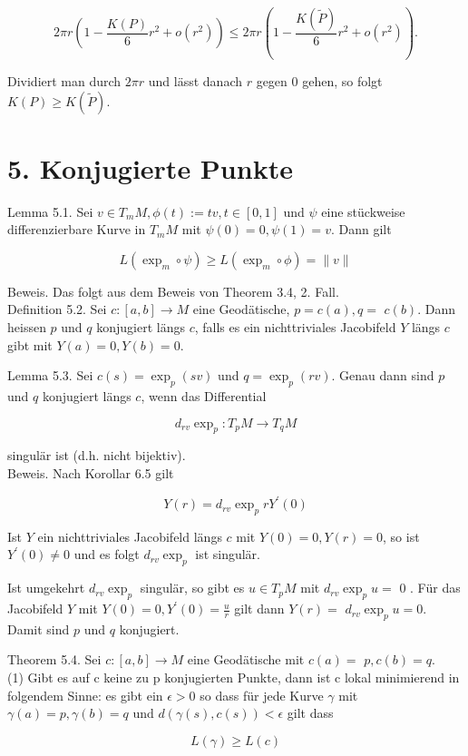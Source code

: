 \documentclass[10pt]{article}
\begin{document}
$$
2 \pi r\left(1-\frac{K(P)}{6} r^{2}+o\left(r^{2}\right)\right) \leq 2 \pi r\left(1-\frac{K(\tilde{P})}{6} r^{2}+o\left(r^{2}\right)\right) .
$$

Dividiert man durch $2 \pi r$ und lässt danach $r$ gegen 0 gehen, so folgt $K(P) \geq K(\tilde{P})$.

\section*{5. Konjugierte Punkte}
Lemma 5.1. Sei $v \in T_{m} M, \phi(t):=t v, t \in[0,1]$ und $\psi$ eine stückweise differenzierbare Kurve in $T_{m} M$ mit $\psi(0)=0, \psi(1)=v$. Dann gilt

$$
L\left(\exp _{m} \circ \psi\right) \geq L\left(\exp _{m} \circ \phi\right)=\|v\|
$$

Beweis. Das folgt aus dem Beweis von Theorem 3.4, 2. Fall.\\
Definition 5.2. Sei $c:[a, b] \rightarrow M$ eine Geodätische, $p=c(a), q=$ $c(b)$. Dann heissen $p$ und $q$ konjugiert längs $c$, falls es ein nichttriviales Jacobifeld $Y$ längs $c$ gibt mit $Y(a)=0, Y(b)=0$.

Lemma 5.3. Sei $c(s)=\exp _{p}(s v)$ und $q=\exp _{p}(r v)$. Genau dann sind $p$ und $q$ konjugiert längs $c$, wenn das Differential

$$
d_{r v} \exp _{p}: T_{p} M \rightarrow T_{q} M
$$

singulär ist (d.h. nicht bijektiv).\\
Beweis. Nach Korollar 6.5 gilt

$$
Y(r)=d_{r v} \exp _{p} r Y^{\prime}(0)
$$

Ist $Y$ ein nichttriviales Jacobifeld längs $c$ mit $Y(0)=0, Y(r)=0$, so ist $Y^{\prime}(0) \neq 0$ und es folgt $d_{r v} \exp _{p}$ ist singulär.

Ist umgekehrt $d_{r v} \exp _{p}$ singulär, so gibt es $u \in T_{p} M$ mit $d_{r v} \exp _{p} u=$ 0 . Für das Jacobifeld $Y$ mit $Y(0)=0, Y^{\prime}(0)=\frac{u}{r}$ gilt dann $Y(r)=$ $d_{r v} \exp _{p} u=0$. Damit sind $p$ und $q$ konjugiert.

Theorem 5.4. Sei $c:[a, b] \rightarrow M$ eine Geodätische mit $c(a)=$ $p, c(b)=q$.\\
(1) Gibt es auf c keine zu p konjugierten Punkte, dann ist c lokal minimierend in folgendem Sinne: es gibt ein $\epsilon>0$ so dass für jede Kurve $\gamma$ mit $\gamma(a)=p, \gamma(b)=q$ und $d(\gamma(s), c(s))<\epsilon$ gilt dass

$$
L(\gamma) \geq L(c)
$$
\end{document}
